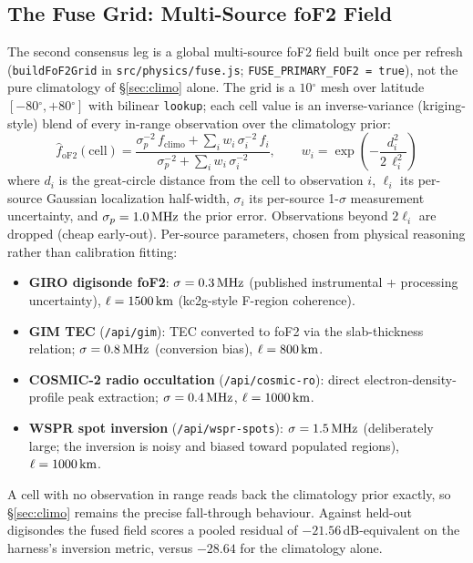 \documentclass[11pt,a4paper]{article}
\newcommand{\SI}[2]{#1\,\text{#2}}
\newcommand{\MHz}{\text{MHz}}
\newcommand{\km}{\text{km}}
\newcommand{\degree}{\ensuremath{{}^\circ}}
\begin{document}
\subsection{The Fuse Grid: Multi-Source foF2 Field}\label{sec:fusegrid}

The second consensus leg is a global multi-source foF2 field
built once
per refresh (\texttt{buildFoF2Grid} in
\texttt{src/physics/fuse.js}; \texttt{FUSE\_PRIMARY\_FOF2 =
true}), not the pure climatology of \S\ref{sec:climo}
alone.  The grid is a $10\degree$ mesh over latitude
$[-80\degree, +80\degree]$ with bilinear \texttt{lookup};
each cell value is an inverse-variance (kriging-style) blend of
every in-range observation over the climatology prior:
\begin{equation}\label{eq:fusecell}
  \hat{f}_{\text{oF2}}(\text{cell}) =
    \frac{\sigma_p^{-2}\, f_{\text{climo}}
      + \sum_i w_i\, \sigma_i^{-2}\, f_i}
         {\sigma_p^{-2} + \sum_i w_i\, \sigma_i^{-2}},
  \qquad
  w_i = \exp\!\left(-\frac{d_i^2}{2\,\ell_i^2}\right)
\end{equation}
where $d_i$ is the great-circle distance from the cell to
observation $i$, $\ell_i$ its per-source Gaussian localization
half-width, $\sigma_i$ its per-source 1-$\sigma$ measurement
uncertainty, and $\sigma_p = \SI{1.0}{\MHz}$ the prior error.
Observations beyond $2\ell_i$ are dropped (cheap early-out).
Per-source parameters, chosen from physical reasoning rather than
calibration fitting:
\begin{itemize}[nosep]
  \item \textbf{GIRO digisonde foF2}: $\sigma = \SI{0.3}{\MHz}$
        (published instrumental + processing uncertainty),
        $\ell = \SI{1500}{\km}$ (kc2g-style F-region coherence).
  \item \textbf{GIM TEC} (\texttt{/api/gim}): TEC converted to
        foF2 via the slab-thickness relation; $\sigma =
        \SI{0.8}{\MHz}$ (conversion bias), $\ell = \SI{800}{\km}$.
  \item \textbf{COSMIC-2 radio occultation}
        (\texttt{/api/cosmic-ro}): direct electron-density-profile
        peak extraction; $\sigma = \SI{0.4}{\MHz}$,
        $\ell = \SI{1000}{\km}$.
  \item \textbf{WSPR spot inversion} (\texttt{/api/wspr-spots}):
        $\sigma = \SI{1.5}{\MHz}$ (deliberately large; the
        inversion is noisy and biased toward populated regions),
        $\ell = \SI{1000}{\km}$.
\end{itemize}
A cell with no observation in range reads back the climatology
prior exactly, so \S\ref{sec:climo} remains the precise
fall-through behaviour.  Against held-out digisondes the fused
field scores a pooled residual of
$-21.56$\,dB-equivalent on the harness's inversion metric,
versus $-28.64$ for the climatology alone.
\end{document}

